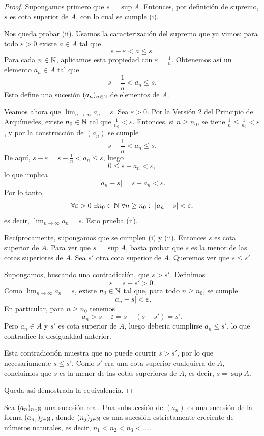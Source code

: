 \begin{proof}
Supongamos primero que $s = \sup A$. Entonces, por definición de supremo,
$s$ es cota superior de $A$, con lo cual se cumple (i).

Nos queda probar (ii). Usamos la caracterización del supremo que ya vimos:
para todo $\varepsilon > 0$ existe $a \in A$ tal que
\[
s - \varepsilon < a \le s.
\]
Para cada $n \in \mathbb{N}$, aplicamos esta propiedad con $\varepsilon = \tfrac{1}{n}$.
Obtenemos así un elemento $a_n \in A$ tal que
\[
s - \frac{1}{n} < a_n \le s.
\]
Esto define una sucesión $(a_n)_{n\in\mathbb{N}}$ de elementos de $A$.

Veamos ahora que $\lim_{n\to\infty} a_n = s$. Sea $\varepsilon > 0$. Por la
Versión 2 del Principio de Arquímedes, existe $n_0 \in \mathbb{N}$ tal que
$\frac{1}{n_0} < \varepsilon$. Entonces, si $n \ge n_0$,
se tiene $\frac{1}{n} \le \frac{1}{n_0} < \varepsilon$, y por la construcción
de $(a_n)$ se cumple
\[
s - \frac{1}{n} < a_n \le s.
\]
De aquí, $s - \varepsilon = s - \frac{1}{n} < a_n \le s$, luego
\[
0 \le s - a_n < \varepsilon,
\]
lo que implica
\[
|a_n - s| = s - a_n < \varepsilon.
\]
Por lo tanto,
\[
\forall \varepsilon > 0\ \exists n_0 \in \N\ \forall n \ge n_0:\ |a_n - s| < \varepsilon,
\]
es decir, $\lim_{n\to\infty} a_n = s$. Esto prueba (ii).

\medskip

Recíprocamente, supongamos que se cumplen (i) y (ii). Entonces $s$ es cota
superior de $A$. Para ver que $s = \sup A$, basta probar que $s$ es la menor
de las cotas superiores de $A$. Sea $s'$ otra cota superior de $A$. Queremos
ver que $s \le s'$.

Supongamos, buscando una contradicción, que $s > s'$. Definimos
\[
\varepsilon = s - s' > 0.
\]
Como $\lim_{n\to\infty} a_n = s$, existe $n_0 \in \mathbb{N}$ tal que, para todo
$n \ge n_0$, se cumple
\[
|a_n - s| < \varepsilon.
\]
En particular, para $n \ge n_0$ tenemos
\[
a_n > s - \varepsilon = s - (s - s') = s'.
\]
Pero $a_n \in A$ y $s'$ es cota superior de $A$, luego debería cumplirse
$a_n \le s'$, lo que contradice la desigualdad anterior.

Esta contradicción muestra que no puede ocurrir $s > s'$, por lo que necesariamente
$s \le s'$. Como $s'$ era una cota superior cualquiera de $A$, concluimos que
$s$ es la menor de las cotas superiores de $A$, es decir, $s = \sup A$.

Queda así demostrada la equivalencia.
\end{proof}

\begin{defi}[Subsucesión]
Sea $(a_n)_{n\in\mathbb{N}}$ una sucesión real. Una subsucesión de $(a_n)$ es una sucesión
de la forma $(a_{n_j})_{j\in\mathbb{N}}$, donde $(n_j)_{j\in\mathbb{N}}$ es una sucesión
estrictamente creciente de números naturales, es decir, $n_1 < n_2 < n_3 < \dots$.
\end{defi}

